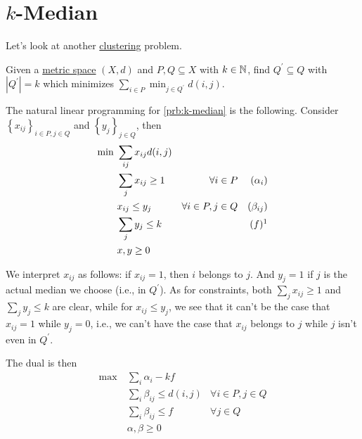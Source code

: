 \section{\(k\)-Median}

Let's look at another \hyperref[prb:clustering]{clustering} problem.

\begin{problem}[\(k\)-median]\label{prb:k-median}
Given a \hyperref[def:metric]{metric space} \((X, d)\) and \(P, Q\subseteq X\) with \(k\in \mathbb{\MakeUppercase{n}} \), find \(Q^\prime \subseteq Q\) with \(\left\vert Q^\prime  \right\vert = k\) which minimizes \(\sum_{i\in P} \min _{j\in Q^\prime } d(i, j)\).
\end{problem}

The natural linear programming for \autoref{prb:k-median} is the following. Consider \(\left\{ x_{ij}  \right\}_{i\in P, j\in Q} \) and \(\left\{ y_j \right\}_{j\in Q} \), then
\begin{align*}
	\min~ & \sum_{ij} x_{ij} d(i, j)                                                \\
	      & \sum_{j} x_{ij} \geq 1   & \forall i\in P         &  & (\alpha _i)      \\
	      & x_{ij} \leq y_j          & \forall i\in P, j\in Q &  & (\beta _{ij})    \\
	      & \sum_{j} y_j \leq k      &                        &  & (f)\footnotemark \\
	      & x, y\geq 0
\end{align*}

\begin{intuition}
	We interpret \(x_{ij} \) as follows: if \(x_{ij} = 1\), then \(i\) belongs to \(j\). And \(y_j=1\) if \(j\) is the actual median we choose (i.e., in \(Q^\prime \)). As for constraints, both \(\sum_{j} x_{ij} \geq 1\) and \(\sum_{j} y_j \leq k\) are clear, while for \(x_{ij} \leq y_j\), we see that it can't be the case that \(x_{ij} = 1\) while \(y_j = 0\), i.e., we can't have the case that \(x_{ij} \) belongs to \(j\) while \(j\) isn't even in \(Q^\prime \).
\end{intuition}

The dual is then
\begin{align*}
	\max~ & \sum_{i} \alpha _i - kf                                    \\
	      & \sum_{i} \beta _{ij} \leq d(i, j) & \forall i\in P, j\in Q \\
	      & \sum_{i} \beta _{ij} \leq f       & \forall j\in Q         \\
	      & \alpha , \beta \geq 0
\end{align*}

